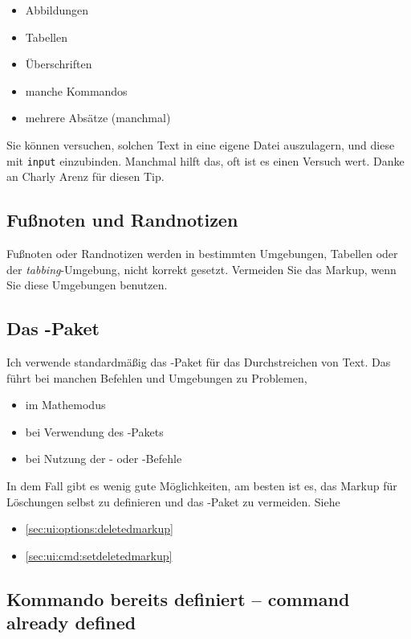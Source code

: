 \begin{itemize}
	\item Abbildungen
	\item Tabellen
	\item Überschriften
	\item manche Kommandos
	\item mehrere Absätze (manchmal)
\end{itemize}

Sie können versuchen, solchen Text in eine eigene Datei auszulagern, und diese mit \texttt{input} einzubinden.
Manchmal hilft das, oft ist es einen Versuch wert.
Danke an Charly Arenz für diesen Tip.

\subsection{Fußnoten und Randnotizen}

Fußnoten oder Randnotizen werden in bestimmten Umgebungen, \zB Tabellen oder der \emph{tabbing}-Umgebung, nicht korrekt gesetzt.
Vermeiden Sie das Markup, wenn Sie diese Umgebungen benutzen.

\subsection{Das -Paket}

Ich verwende standardmäßig das -Paket für das Durchstreichen von Text.
Das führt bei manchen Befehlen und Umgebungen zu Problemen, \zB

\begin{itemize}
	\item im Mathemodus
	\item bei Verwendung des -Pakets
	\item bei Nutzung der - oder -Befehle
\end{itemize}

In dem Fall gibt es wenig gute Möglichkeiten, am besten ist es, das Markup für Löschungen selbst zu definieren und das -Paket zu vermeiden.
Siehe

\begin{itemize}
	\item \autoref{sec:ui:options:deletedmarkup}
	\item \autoref{sec:ui:cmd:setdeletedmarkup}
\end{itemize}


\subsection{Kommando bereits definiert -- command already defined}

